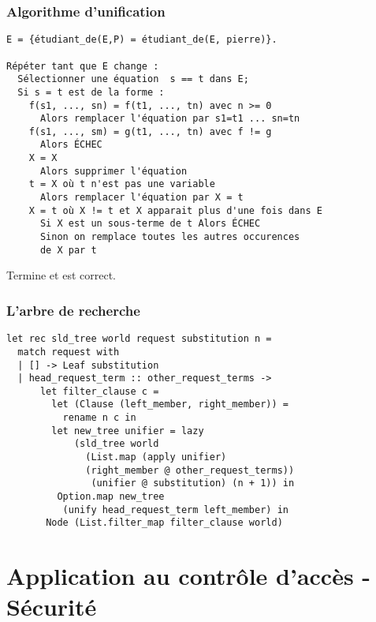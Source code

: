 \documentclass[aspectratio=43]{beamer}
\begin{document}
\begin{frame}[fragile]
  \frametitle{Algorithme d'unification}
  \begin{verbatim}
E = {étudiant_de(E,P) = étudiant_de(E, pierre)}.

Répéter tant que E change :
  Sélectionner une équation  s == t dans E;
  Si s = t est de la forme :
    f(s1, ..., sn) = f(t1, ..., tn) avec n >= 0
      Alors remplacer l'équation par s1=t1 ... sn=tn
    f(s1, ..., sm) = g(t1, ..., tn) avec f != g
      Alors ÉCHEC
    X = X
      Alors supprimer l'équation
    t = X où t n'est pas une variable
      Alors remplacer l'équation par X = t
    X = t où X != t et X apparait plus d'une fois dans E
      Si X est un sous-terme de t Alors ÉCHEC
      Sinon on remplace toutes les autres occurences
      de X par t
  \end{verbatim}

  \vspace{1em}
  Termine et est correct.
\end{frame}


\begin{frame}[fragile]
  \frametitle{L'arbre de recherche}
  \begin{verbatim}
let rec sld_tree world request substitution n =
  match request with
  | [] -> Leaf substitution
  | head_request_term :: other_request_terms ->
      let filter_clause c =
        let (Clause (left_member, right_member)) =
          rename n c in
        let new_tree unifier = lazy
            (sld_tree world
              (List.map (apply unifier)
              (right_member @ other_request_terms))
               (unifier @ substitution) (n + 1)) in
         Option.map new_tree
          (unify head_request_term left_member) in
       Node (List.filter_map filter_clause world)
  \end{verbatim}
\end{frame}


\section{Application au contrôle d'accès - Sécurité}
\end{document}
